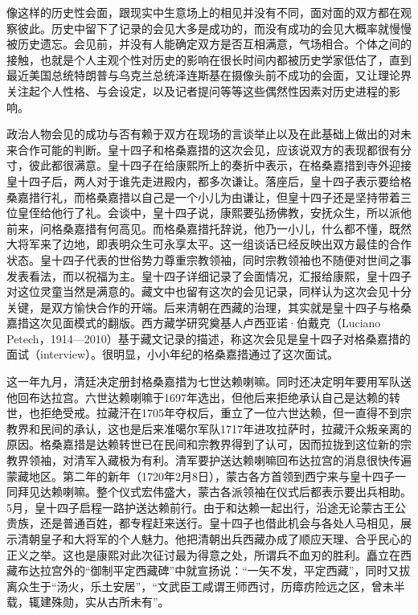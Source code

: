 
像这样的历史性会面，跟现实中生意场上的相见并没有不同，面对面的双方都在观察彼此。历史中留下了记录的会见大多是成功的，而没有成功的会见大概率就慢慢被历史遗忘。会见前，并没有人能确定双方是否互相满意，气场相合。个体之间的接触，也就是个人主观个性对历史的影响在很长时间内都被历史学家低估了，直到最近美国总统特朗普与乌克兰总统泽连斯基在摄像头前不成功的会面，又让理论界关注起个人性格、与会设定，以及记者提问等等这些偶然性因素对历史进程的影响。



政治人物会见的成功与否有赖于双方在现场的言谈举止以及在此基础上做出的对未来合作可能的判断。皇十四子和格桑嘉措的这次会见，应该说双方的表现都很有分寸，彼此都很满意。皇十四子在给康熙所上的奏折中表示，在格桑嘉措到寺外迎接皇十四子后，两人对于谁先走进殿内，都多次谦让。落座后，皇十四子表示要给格桑嘉措行礼，而格桑嘉措以自己是一个小儿为由谦让，但皇十四子还是坚持带着三位皇侄给他行了礼。会谈中，皇十四子说，康熙要弘扬佛教，安抚众生，所以派他前来，问格桑嘉措有何高见。而格桑嘉措托辞说，他乃一小儿，什么都不懂，既然大将军来了边地，即表明众生可永享太平。这一组谈话已经反映出双方最佳的合作状态。皇十四子代表的世俗势力尊重宗教领袖，同时宗教领袖也不随便对世间之事发表看法，而以祝福为主。皇十四子详细记录了会面情况，汇报给康熙，皇十四子对这位灵童当然是满意的。藏文中也留有这次的会见记录，同样认为这次会见十分关键，是双方愉快合作的开端。后来清朝在西藏的治理，其实就是皇十四子与格桑嘉措这次见面模式的翻版。西方藏学研究奠基人卢西亚诺·伯戴克（Luciano Petech，1914—2010）基于藏文记录的描述，称这次会见是皇十四子对格桑嘉措的面试（interview）。很明显，小小年纪的格桑嘉措通过了这次面试。



这一年九月，清廷决定册封格桑嘉措为七世达赖喇嘛。同时还决定明年要用军队送他回布达拉宫。六世达赖喇嘛于1697年选出，但他后来拒绝承认自己是达赖的转世，也拒绝受戒。拉藏汗在1705年夺权后，重立了一位六世达赖，但一直得不到宗教界和民间的承认，这也是后来准噶尔军队1717年进攻拉萨时，拉藏汗众叛亲离的原因。格桑嘉措是达赖转世已在民间和宗教界得到了认可，因而拉拢到这位新的宗教界领袖，对清军入藏极为有利。清军要护送达赖喇嘛回布达拉宫的消息很快传遍蒙藏地区。第二年的新年（1720年2月8日），蒙古各方首领到西宁来与皇十四子一同拜见达赖喇嘛。整个仪式宏伟盛大，蒙古各派领袖在仪式后都表示要出兵相助。5月，皇十四子启程一路护送达赖前行。由于和达赖一起出行，沿途无论蒙古王公贵族，还是普通百姓，都专程赶来送行。皇十四子也借此机会与各处人马相见，展示清朝皇子和大将军的个人魅力。他把清朝出兵西藏办成了顺应天理、合乎民心的正义之举。这也是康熙对此次征讨最为得意之处，所谓兵不血刃的胜利。矗立在西藏布达拉宫外的“御制平定西藏碑”中就宣扬说：“一矢不发，平定西藏”，同时又拔离众生于“汤火，乐土安居”，“文武臣工咸谓王师西讨，历瘴疠险远之区，曾未半载，辄建殊勋，实从古所未有”。

